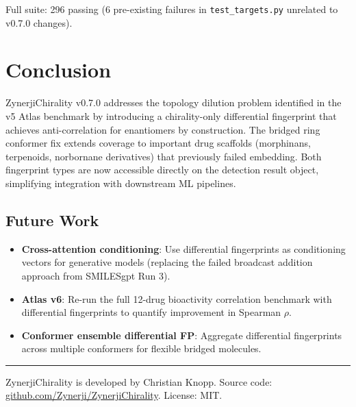 \documentclass[11pt,a4paper]{article}
\begin{document}
Full suite: 296 passing (6 pre-existing failures in \texttt{test\_targets.py} unrelated to v0.7.0 changes).

\section{Conclusion}

ZynerjiChirality v0.7.0 addresses the topology dilution problem identified in the v5 Atlas benchmark by introducing a chirality-only differential fingerprint that achieves anti-correlation for enantiomers by construction. The bridged ring conformer fix extends coverage to important drug scaffolds (morphinans, terpenoids, norbornane derivatives) that previously failed embedding. Both fingerprint types are now accessible directly on the detection result object, simplifying integration with downstream ML pipelines.

\subsection{Future Work}

\begin{itemize}[leftmargin=*]
    \item \textbf{Cross-attention conditioning}: Use differential fingerprints as conditioning vectors for generative models (replacing the failed broadcast addition approach from SMILESgpt Run 3).
    \item \textbf{Atlas v6}: Re-run the full 12-drug bioactivity correlation benchmark with differential fingerprints to quantify improvement in Spearman $\rho$.
    \item \textbf{Conformer ensemble differential FP}: Aggregate differential fingerprints across multiple conformers for flexible bridged molecules.
\end{itemize}

\vspace{1cm}
\hrule
\vspace{0.5cm}
\noindent\small\color{gray}
ZynerjiChirality is developed by Christian Knopp.
Source code: \href{https://github.com/Zynerji/ZynerjiChirality}{github.com/Zynerji/ZynerjiChirality}.
License: MIT.
\end{document}
